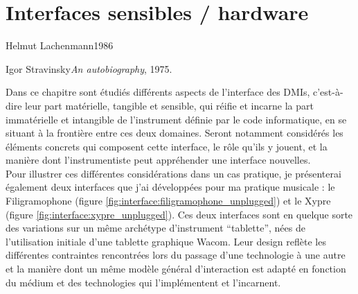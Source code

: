 %
\chapter{Interfaces sensibles / hardware}
\label{ch:interfaces}

{Helmut Lachenmann}{1986}


{Igor Stravinsky}{\textit{An autobiography}, 1975. \cite{stravinsky_autobiography_1975}}

\vspace*{\fill}

\noindent Dans ce chapitre sont étudiés différents aspects de l'interface des \glspl{DMI}, c'est-à-dire leur part matérielle, tangible et sensible, qui réifie et incarne la part immatérielle et intangible de l'instrument définie par le code informatique, en se situant à la frontière entre ces deux domaines. Seront notamment considérés les éléments concrets qui composent cette interface, le rôle qu'ils y jouent, et la manière dont l'instrumentiste peut appréhender une interface nouvelles.\\
\indent Pour illustrer ces différentes considérations dans un cas pratique, je présenterai également deux interfaces que j'ai développées pour ma pratique musicale : le Filigramophone (figure \ref{fig:interface:filigramophone_unplugged}) et le Xypre (figure \ref{fig:interface:xypre_unplugged}). Ces deux interfaces sont en quelque sorte des variations sur un même archétype d'instrument ``tablette'', nées de l'utilisation initiale d'une tablette graphique Wacom. Leur design reflète les différentes contraintes rencontrées lors du passage d'une technologie à une autre et la manière dont un même modèle général d'interaction est adapté en fonction du médium et des technologies qui l'implémentent et l'incarnent.

